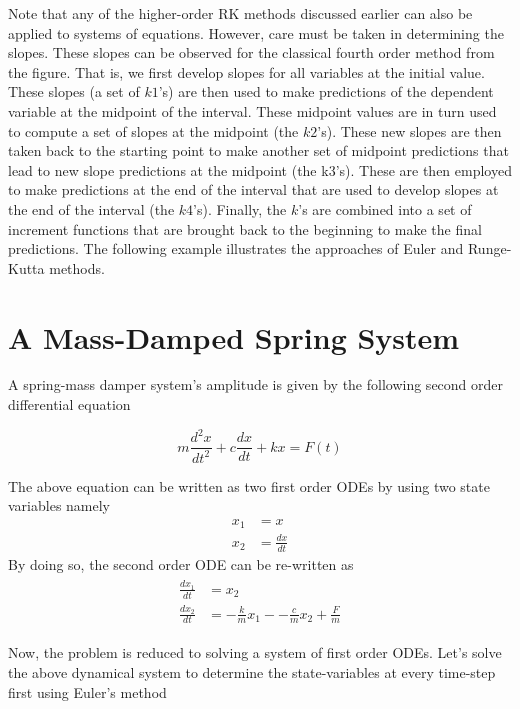 \documentclass[book.tex]{subfiles}
\begin{document}
Note that any of the higher-order RK methods discussed earlier can also be applied to systems of equations. However, care must be taken in determining the slopes. These slopes can be observed for the classical fourth order method from the figure. That is, we first develop slopes for all variables at the initial value. These slopes (a set of $k1$’s) are then used to make predictions of the dependent variable at the midpoint of the interval. These midpoint values are in turn used to compute a set of slopes at the midpoint (the $k2$’s). These new slopes are then taken back to the starting point to make another set of midpoint predictions that lead to new slope predictions at the midpoint (the k3’s). These are then employed to make predictions at the end of the interval that are used to develop slopes at the end of the interval (the $k4$’s). Finally, the $k$’s are combined into a set of increment functions that are brought back to the beginning to make the final predictions. The following example illustrates the approaches of Euler and Runge-Kutta methods.

\section{A Mass-Damped Spring System}
A spring-mass damper system's amplitude is given by the following second order differential equation

\begin{equation*}
m\frac{d^2x}{dt^2} + c\frac{dx}{dt} + kx = F(t)
\end{equation*}

The above equation can be written as two first order ODEs by using two state variables namely 
\begin{align}
x_1 &= x\\ 
x_2 &= \frac{dx}{dt}
\end{align}
By doing so, the second order ODE can be re-written as
\begin{eqnarray*}
	\begin{split}
		\frac{dx_1}{dt} &= x_2\\
		\frac{dx_2}{dt} &= 	-\frac{k}{m}x_1 - -\frac{c}{m}x_2 + \frac{F}{m}
	\end{split}
\end{eqnarray*}

Now, the problem is reduced to solving a system of first order ODEs. Let's solve the above dynamical system to determine the state-variables at every time-step first using Euler's method
\end{document}
